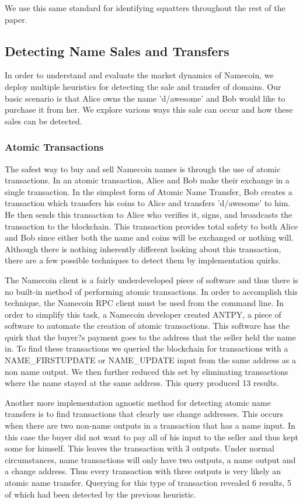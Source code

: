 We use this same standard for identifying squatters throughout the rest of the paper.

\subsection{Detecting Name Sales and Transfers}

In order to understand and evaluate the market dynamics of Namecoin, we deploy multiple heuristics for detecting the sale and transfer of domains. Our basic scenario is that Alice owns the name 'd/awesome' and Bob would like to purchase it from her. We explore various ways this sale can occur and how these sales can be detected.

\subsubsection{Atomic Transactions}

The safest way to buy and sell Namecoin names is through the use of atomic transactions. In an atomic transaction, Alice and Bob make their exchange in a single transaction. In the simplest form of Atomic Name Transfer, Bob creates a transaction which transfers his coins to Alice and transfers 'd/awesome' to him. He then sends this transaction to Alice who verifies it, signs, and broadcasts the transaction to the blockchain. This transaction provides total safety to both Alice and Bob since either both the name and coins will be exchanged or nothing will. Although there is nothing inherently different looking about this transaction, there are a few possible techniques to detect them by implementation quirks.

The Namecoin client is a fairly underdeveloped piece of software and thus there is no built-in method of performing atomic transactions. In order to accomplish this technique, the Namecoin RPC client must be used from the command line. In order to simplify this task, a Namecoin developer created ANTPY, a piece of software to automate the creation of atomic transactions. This software has the quirk that the buyer?s payment goes to the address that the seller held the name in. To find these transactions we queried the blockchain for transactions with a NAME\_FIRSTUPDATE or NAME\_UPDATE input from the same address as a non name output. We then further reduced this set by eliminating transactions where the name stayed at the same address. This query produced 13 results.

Another more implementation agnostic method for detecting atomic name transfers is to find transactions that clearly use change addresses. This occurs when there are two non-name outputs in a transaction that has a name input. In this case the buyer did not want to pay all of his input to the seller and thus kept some for himself. This leaves the transaction with 3 outputs. Under normal circumstances, name transactions will only have two outputs, a name output and a change address. Thus every transaction with three outputs is very likely an atomic name transfer. Querying for this type of transaction revealed 6 results, 5 of which had been detected by the previous heuristic.

